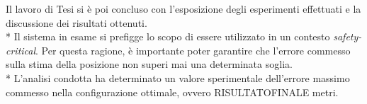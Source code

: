 Il lavoro di Tesi si \`e poi concluso con l'esposizione degli esperimenti effettuati e la discussione dei risultati ottenuti.\\*
Il sistema in esame si prefigge lo scopo di essere utilizzato in un contesto \emph{safety-critical}. Per questa ragione, \`e importante poter garantire che l'errore commesso sulla stima della posizione non superi mai una determinata soglia.\\* L'analisi condotta ha determinato un valore sperimentale dell'errore massimo commesso nella configurazione ottimale, ovvero RISULTATOFINALE metri.
